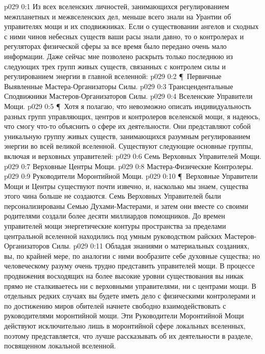 \vs p029 0:1 Из всех вселенских личностей, занимающихся регулированием межпланетных и межвселенских дел, меньше всего знали на Урантии об управителях мощи и их сподвижниках. Если о существовании ангелов и сходных с ними чинов небесных существ ваши расы знали давно, то о контролерах и регуляторах физической сферы за все время было передано очень мало информации. Даже сейчас мне позволено раскрыть только последнюю из следующих трех групп живых существ, связанных с контролем силы и регулированием энергии в главной вселенной:
\vs p029 0:2 \P\ \bibnobreakspace Первичные Выявленные Мастера\hyp{}Организаторы Силы.
\vs p029 0:3 \bibnobreakspace Трансцендентальные Сподвижники Мастеров\hyp{}Организаторов Силы.
\vs p029 0:4 \bibnobreakspace Вселенские Управители Мощи.
\vs p029 0:5 \P\ Хотя я полагаю, что невозможно описать индивидуальность разных групп управляющих, центров и контролеров вселенской мощи, я надеюсь, что смогу что\hyp{}то объяснить о сфере их деятельности. Они представляют собой уникальную группу живых существ, занимающихся разумным регулированием энергии во всей великой вселенной. Существуют следующие основные группы, включая и верховных управителей:
\vs p029 0:6 \bibnobreakspace Семь Верховных Управителей Мощи.
\vs p029 0:7 \bibnobreakspace Верховные Центры Мощи.
\vs p029 0:8 \bibnobreakspace Мастера\hyp{}Физические Контролеры.
\vs p029 0:9 \bibnobreakspace Руководители Моронтийной Мощи.
\vs p029 0:10 \P\ Верховные Управители Мощи и Центры существуют почти извечно, и, насколько мы знаем, существа этого чина больше не создаются. Семь Верховных Управителей были персонализированы Семью Духами\hyp{}Мастерами, и затем они вместе со своими родителями создали более десяти миллиардов помощников. До времен управителей мощи энергетические контуры пространства за пределами центральной вселенной находились под умным руководством райских Мастеров\hyp{}Организаторов Силы.
\vs p029 0:11 Обладая знаниями о материальных созданиях, вы, по крайней мере, по аналогии с ними вообразите себе духовные существа; но человеческому разуму очень трудно представить управителей мощи. В процессе продвижения восходящих на более высокие уровни существования вы никак прямо не сталкиваетесь ни с верховными управителями, ни с центрами мощи. В отдельных редких случаях вы будете иметь дело с физическими контролерами и по достижению миров обителей начнете свободно взаимодействовать с руководителями моронтийной мощи. Эти Руководители Моронтийной Мощи действуют исключительно лишь в моронтийной сфере локальных вселенных, поэтому представляется, что лучше рассказывать об их деятельности в разделе, посвященном локальной вселенной.
